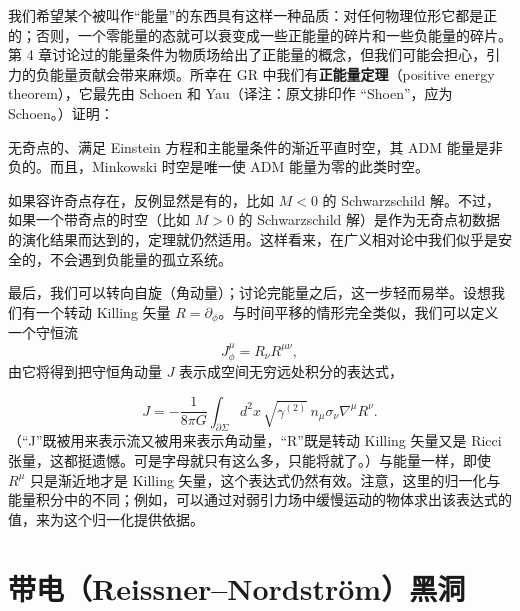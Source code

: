 我们希望某个被叫作“能量”的东西具有这样一种品质：对任何物理位形它都是正的；否则，一个零能量的态就可以衰变成一些正能量的碎片和一些负能量的碎片。第 4 章讨论过的能量条件为物质场给出了正能量的概念，但我们可能会担心，引力的负能量贡献会带来麻烦。所幸在 GR 中我们有\textbf{正能量定理}（positive energy theorem），它最先由 Schoen 和 Yau（译注：原文排印作 “Shoen”，应为 Schoen。）证明：

无奇点的、满足 Einstein 方程和主能量条件的渐近平直时空，其 ADM 能量是非负的。而且，Minkowski 时空是唯一使 ADM 能量为零的此类时空。

如果容许奇点存在，反例显然是有的，比如 $M<0$ 的 Schwarzschild 解。不过，如果一个带奇点的时空（比如 $M>0$ 的 Schwarzschild 解）是作为无奇点初数据的演化结果而达到的，定理就仍然适用。这样看来，在广义相对论中我们似乎是安全的，不会遇到负能量的孤立系统。

最后，我们可以转向自旋（角动量）；讨论完能量之后，这一步轻而易举。设想我们有一个转动 Killing 矢量 $R=\partial_{\phi}$。与时间平移的情形完全类似，我们可以定义一个守恒流
\begin{equation*}
J^{\mu}_{\phi} = R_{\nu}R^{\mu\nu},
\tag{6.47}
\end{equation*}
由它将得到把守恒角动量 $J$ 表示成空间无穷远处积分的表达式，

\begin{equation*}
\boxed{\,J = -\frac{1}{8\pi G}\int_{\partial\Sigma} d^{2}x\,\sqrt{\gamma^{(2)}}\, n_{\mu}\sigma_{\nu}\nabla^{\mu}R^{\nu}.\,}
\tag{6.48}
\end{equation*}
（“J”既被用来表示流又被用来表示角动量，“R”既是转动 Killing 矢量又是 Ricci 张量，这都挺遗憾。可是字母就只有这么多，只能将就了。）与能量一样，即使 $R^{\mu}$ 只是渐近地才是 Killing 矢量，这个表达式仍然有效。注意，这里的归一化与能量积分中的不同；例如，可以通过对弱引力场中缓慢运动的物体求出该表达式的值，来为这个归一化提供依据。

\section{带电（Reissner–Nordström）黑洞}

